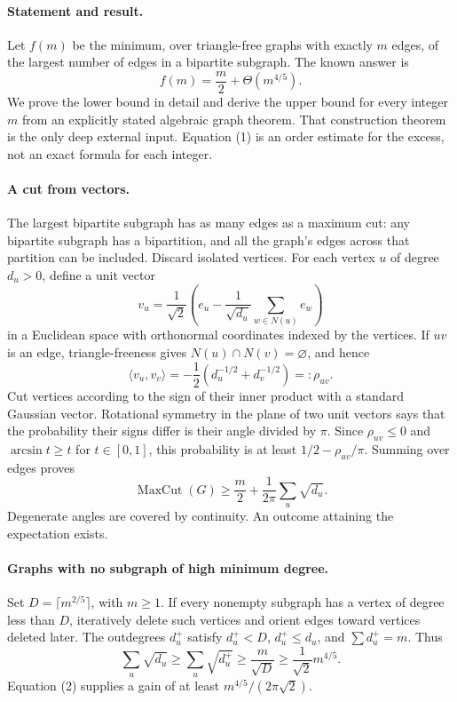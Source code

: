 \paragraph{Statement and result.}
Let \(f(m)\) be the minimum, over triangle-free graphs with exactly \(m\) edges, of the largest number of edges in a bipartite subgraph. The known answer is
\[
 f(m)=\frac m2+\Theta(m^{4/5}). \tag{1}
\]
We prove the lower bound in detail and derive the upper bound for every integer \(m\) from an explicitly stated algebraic graph theorem. That construction theorem is the only deep external input. Equation (1) is an order estimate for the excess, not an exact formula for each integer.

\paragraph{A cut from vectors.}
The largest bipartite subgraph has as many edges as a maximum cut: any bipartite subgraph has a bipartition, and all the graph's edges across that partition can be included. Discard isolated vertices. For each vertex \(u\) of degree \(d_u>0\), define a unit vector
\[
 v_u=\frac1{\sqrt2}\left(e_u-\frac1{\sqrt{d_u}}\sum_{w\in N(u)}e_w\right)
\]
in a Euclidean space with orthonormal coordinates indexed by the vertices. If \(uv\) is an edge, triangle-freeness gives \(N(u)\cap N(v)=\varnothing\), and hence
\[
 \langle v_u,v_v\rangle=-\frac12\left(d_u^{-1/2}+d_v^{-1/2}\right)=:\rho_{uv}.
\]
Cut vertices according to the sign of their inner product with a standard Gaussian vector. Rotational symmetry in the plane of two unit vectors says that the probability their signs differ is their angle divided by \(\pi\). Since \(\rho_{uv}\leq0\) and \(\arcsin t\geq t\) for \(t\in[0,1]\), this probability is at least \(1/2-\rho_{uv}/\pi\). Summing over edges proves
\[
 \operatorname{MaxCut}(G)\geq\frac m2+
 \frac1{2\pi}\sum_u\sqrt{d_u}. \tag{2}
\]
Degenerate angles are covered by continuity. An outcome attaining the expectation exists.

\paragraph{Graphs with no subgraph of high minimum degree.}
Set \(D=\lceil m^{2/5}\rceil\), with \(m\geq1\). If every nonempty subgraph has a vertex of degree less than \(D\), iteratively delete such vertices and orient edges toward vertices deleted later. The outdegrees \(d_u^+\) satisfy \(d_u^+<D\), \(d_u^+\leq d_u\), and \(\sum d_u^+=m\). Thus
\[
 \sum_u\sqrt{d_u}\geq\sum_u\sqrt{d_u^+}
 \geq\frac m{\sqrt D}\geq\frac1{\sqrt2}m^{4/5}.
\]
Equation (2) supplies a gain of at least \(m^{4/5}/(2\pi\sqrt2)\).

